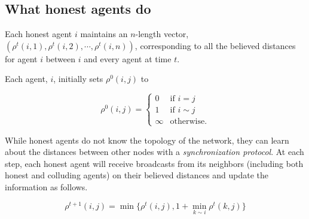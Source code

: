\documentclass{comnet}
\begin{document}




\subsection{What honest agents do} \label{sec:synchronization}

Each honest agent $i$ maintains an $n$-length vector, $(\rho^t(i,1), \rho^t(i,2),\cdots,\rho^t(i,n))$, corresponding to all the believed distances for agent $i$ between $i$ and every agent at time $t$.

Each agent, $i$, initially sets $\rho^0(i,j)$ to

\begin{equation} \label{unifromd0}
   \rho^0(i,j) =
    \begin{cases}
        0 & \text{if } i = j \\
        1 & \text{if } i \sim j \\
        \infty & \text{otherwise.}
    \end{cases}
\end{equation}
 
While honest agents do not know the topology of the network, they can learn about the distances between other nodes with a {\it synchronization protocol}. At each step, each honest agent will receive broadcasts from its neighbors (including both honest and colluding agents) on their believed distances and update the information as follows.

\begin{equation}
   \rho^{t+1}(i,j) = \min \{ \rho^{t}(i,j), 1 + \min_{k \sim i} \rho^{t}(k,j) \} \label{uniformd}
\end{equation}
\end{document}
